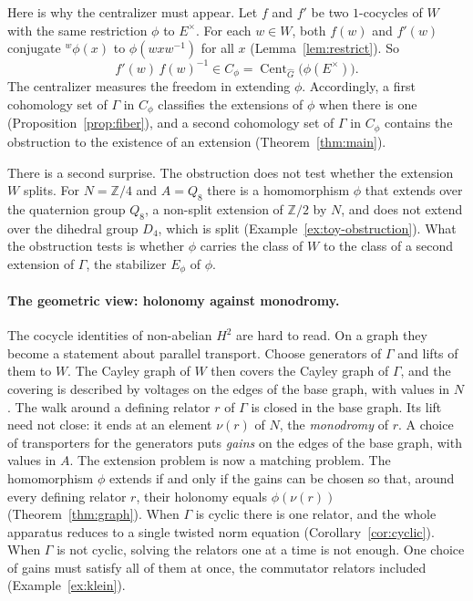 \documentclass[12pt,letterpaper]{article}
\numberwithin{equation}{section}
\theoremstyle{plain}
\theoremstyle{definition}
\newcommand{\Z}{\mathbb{Z}}
\newcommand{\Gh}{\widehat{G}}
\newcommand{\act}[2]{{}^{#1}\!#2}          %
\DeclareMathOperator{\Cent}{Cent}
\begin{document}
Here is why the centralizer must appear. Let $f$ and $f'$ be two
$1$-cocycles of $W$ with the same restriction $\phi$ to $E^\times$. For
each $w\in W$, both $f(w)$ and $f'(w)$ conjugate $\act{w}{\phi(x)}$ to
$\phi(wxw^{-1})$ for all $x$ (Lemma~\ref{lem:restrict}). So
\[
f'(w)\,f(w)^{-1}\in C_\phi=\Cent_{\Gh}\bigl(\phi(E^\times)\bigr).
\]
The centralizer measures the freedom in extending $\phi$. Accordingly, a
first cohomology set of $\Gamma$ in $C_\phi$ classifies the extensions of
$\phi$ when there is one (Proposition~\ref{prop:fiber}), and a second
cohomology set of $\Gamma$ in $C_\phi$ contains the obstruction to the
existence of an extension (Theorem~\ref{thm:main}).

There is a second surprise. The obstruction does not test whether the
extension $W$ splits. For $N=\Z/4$ and $A=Q_8$ there is a homomorphism
$\phi$ that extends over the quaternion group $Q_8$, a non-split
extension of $\Z/2$ by $N$, and does not extend over the dihedral group
$D_4$, which is split (Example~\ref{ex:toy-obstruction}). What the
obstruction tests is whether $\phi$ carries the class of $W$ to the
class of a second extension of $\Gamma$, the stabilizer $E_\phi$ of
$\phi$.

\paragraph{The geometric view: holonomy against monodromy.}
The cocycle identities of non-abelian $H^2$ are hard to read. On a
graph they become a statement about parallel transport. Choose
generators of $\Gamma$ and lifts of them to $W$. The Cayley graph of $W$
then covers the Cayley graph of $\Gamma$, and the covering is described
by voltages on the edges of the base graph, with values in $N$. The walk
around a defining relator $r$ of $\Gamma$ is closed in the base graph.
Its lift need not close: it ends at an element $\nu(r)$ of $N$, the
\emph{monodromy} of $r$. A choice of transporters for the generators
puts \emph{gains} on the edges of the base graph, with values in $A$.
The extension problem is now a matching problem. The homomorphism $\phi$
extends if and only if the gains can be chosen so that, around every
defining relator $r$, their holonomy equals $\phi(\nu(r))$
(Theorem~\ref{thm:graph}). When $\Gamma$ is cyclic there is one relator,
and the whole apparatus reduces to a single twisted norm equation
(Corollary~\ref{cor:cyclic}). When $\Gamma$ is not cyclic, solving the
relators one at a time is not enough. One choice of gains must satisfy
all of them at once, the commutator relators included
(Example~\ref{ex:klein}).
\end{document}
